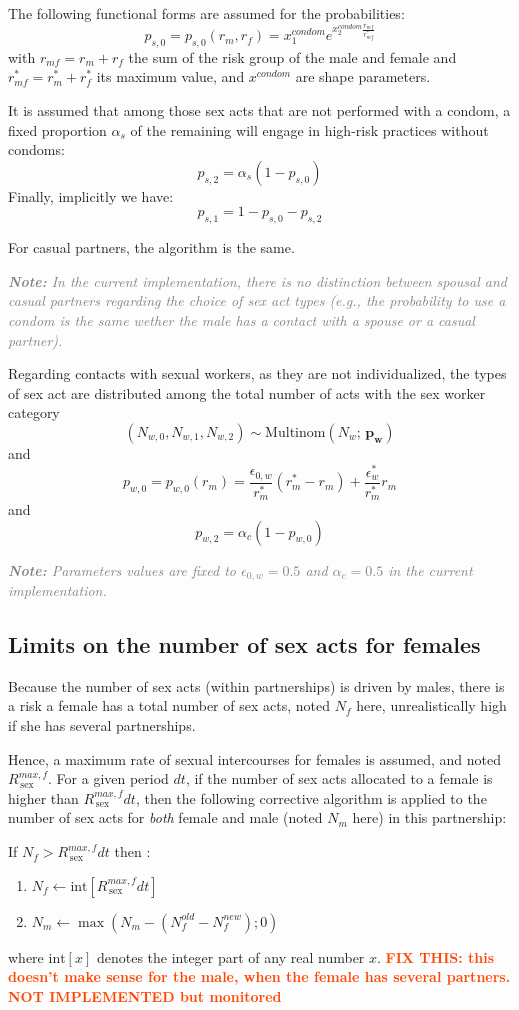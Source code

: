 \documentclass[11pt, onecolumn]{article}
\newcommand{\warning}[1]{\textbf{\textcolor{OrangeRed}{#1}}}
\newcommand{\note}[1]{\textcolor{Grey}{\textit{\textbf{Note:} #1}}}
\begin{document}
The following functional forms are assumed for the probabilities:
$$p_{s,0}=p_{s,0} (r_m,r_f) =x^{condom}_1 e^{x^{condom}_2 \frac{r_{mf}}{r_{mf}^*}}$$ 
with $r_{mf} = r_m+r_f$ the sum of the risk group of the male and female and $r_{mf}^* = r_m^*+r_f^*$ its maximum value, and $x^{condom}$ are shape parameters.

It is assumed that among those sex acts that are not performed with a condom, a fixed proportion $\alpha_s$ of the remaining will engage in high-risk practices without condoms:
$$p_{s,2} = \alpha_s (1-p_{s,0})$$ 
Finally, implicitly we have:
$$p_{s,1} = 1-p_{s,0}-p_{s,2}$$ 

For casual partners, the algorithm is the same.

\note{In the current implementation, there is no distinction between spousal and casual partners regarding the choice of sex act types (e.g., the probability to use a condom is the same wether the male has a contact with a spouse or a casual partner).}

Regarding contacts with sexual workers, as they are not individualized, the types of sex act are distributed among the total number of acts with the sex worker category
$$\left(N_{w,0},N_{w,1},N_{w,2}\right) \sim \mathrm{Multinom}(N_w;\, \mathbf{p_w}) $$
and
$$p_{w,0}=p_{w,0} (r_m) = \frac{\epsilon_{0,w}}{r_{m}^*}(r_{m}^*-r_{m}) + \frac{\epsilon_w^*}{r_{m}^*}r_{m}$$ 
and
$$p_{w,2} = \alpha_c (1-p_{w,0})$$ 

\note{Parameters values are fixed to $\epsilon_{0,w}=0.5$ and $\alpha_c=0.5$ in the current implementation.}

\subsection{Limits on the number of sex acts for females}
Because the number of sex acts (within partnerships) is driven by males, there is a risk a female has a total number of sex acts, noted $N_f$ here, unrealistically high if she has several partnerships.

Hence, a maximum rate of sexual intercourses for females is assumed, and noted $R_{\mathrm{\,sex}}^{max,f}$. For a given period $dt$, if the number of sex acts allocated to a female is higher than $R_{\mathrm{\,sex}}^{max,f}dt$, then the following corrective algorithm is applied to the number of sex acts for \emph{both} female and male (noted $N_m$ here) in this partnership:

If $N_f>R_{\mathrm{\,sex}}^{max,f}dt$ then :
\begin{enumerate}
\item $N_f \leftarrow \text{int}[R_{\mathrm{\,sex}}^{max,f}dt]$
\item $N_m \leftarrow \max\left(N_m - (N_f^{old}-N_f^{new}) ; 0\right)$
\end{enumerate}
where $ \text{int}[x]$ denotes the integer part of any real number $x$.
\warning{FIX THIS: this doesn't make sense for the male, when the female has several partners. NOT IMPLEMENTED but monitored}
\end{document}
